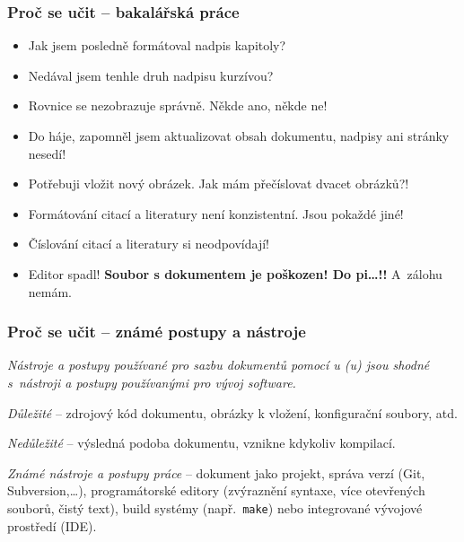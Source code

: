 \begin{frame}
	\frametitle{Proč se učit  -- bakalářská práce}
	\begin{itemize}
		\item Jak jsem posledně formátoval nadpis kapitoly?
		\item Nedával jsem tenhle druh nadpisu kurzívou?
		\item Rovnice se nezobrazuje správně. Někde ano, někde ne!
		\item Do háje, zapomněl jsem aktualizovat obsah dokumentu, nadpisy ani stránky nesedí!
		\item Potřebuji vložit nový obrázek. Jak mám přečíslovat dvacet obrázků?!
		\item Formátování citací a literatury není konzistentní. Jsou pokaždé jiné!
		\item Číslování citací a literatury si neodpovídají!
		\item Editor spadl! \alert{\textbf{Soubor s dokumentem je poškozen! Do pi\ldots!!}} A~zálohu nemám.
	\end{itemize}
\end{frame}


\begin{frame}
	\frametitle{Proč se učit  -- známé postupy a nástroje}
	\begin{center}
		\emph{Nástroje a postupy používané pro sazbu dokumentů pomocí u (u) jsou shodné s~nástroji a postupy používanými pro vývoj software.}
	\end{center}
	\emph{Důležité} -- zdrojový kód dokumentu, obrázky k vložení, konfigurační soubory, atd.\par
	\emph{Nedůležité} -- výsledná podoba dokumentu, vznikne kdykoliv kompilací.\par
	\emph{Známé nástroje a postupy práce} -- dokument jako projekt, správa verzí (Git, Subversion,\ldots), programátorské editory (zvýraznění syntaxe, více otevřených souborů, čistý text), build systémy (např.\ \texttt{make}) nebo integrované vývojové prostředí (IDE).
\end{frame}


